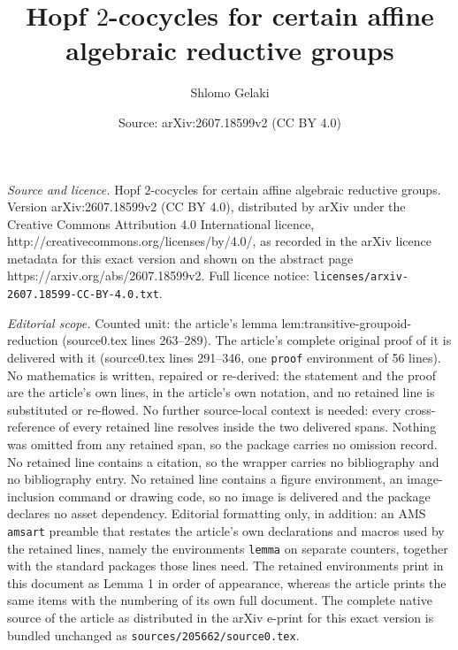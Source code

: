 \documentclass[10pt,a4paper]{amsart}
\title{Hopf $2$-cocycles for certain affine algebraic reductive groups}
\author{Shlomo Gelaki}
\date{Source: arXiv:2607.18599v2 (CC BY 4.0)}
\begin{document}
\maketitle

\noindent\emph{Source and licence.} Hopf $2$-cocycles for certain affine algebraic reductive groups. Version arXiv:2607.18599v2 (CC BY 4.0), distributed by arXiv under the Creative Commons Attribution 4.0 International licence, http://creativecommons.org/licenses/by/4.0/, as recorded in the arXiv licence metadata for this exact version and shown on the abstract page https://arxiv.org/abs/2607.18599v2. Full licence notice: \texttt{licenses/arxiv-2607.18599-CC-BY-4.0.txt}.\par\smallskip

\noindent\textit{Editorial scope.} Counted unit: the article's lemma lem:transitive-groupoid-reduction (source0.tex lines 263--289). The article's complete original proof of it is delivered with it (source0.tex lines 291--346, one \texttt{proof} environment of 56 lines). No mathematics is written, repaired or re-derived: the statement and the proof are the article's own lines, in the article's own notation, and no retained line is substituted or re-flowed.  No further source-local context is needed: every cross-reference of every retained line resolves inside the two delivered spans.  Nothing was omitted from any retained span, so the package carries no omission record.  No retained line contains a citation, so the wrapper carries no bibliography and no bibliography entry.  No retained line contains a figure environment, an image-inclusion command or drawing code, so no image is delivered and the package declares no asset dependency.  Editorial formatting only, in addition: an AMS \texttt{amsart} preamble that restates the article's own declarations and macros used by the retained lines, namely the environments \texttt{lemma} on separate counters, together with the standard packages those lines need.  The retained environments print in this document as Lemma 1 in order of appearance, whereas the article prints the same items with the numbering of its own full document.  The complete native source of the article as distributed in the arXiv e-print for this exact version is bundled unchanged as \texttt{sources/205662/source0.tex}.
\end{document}
